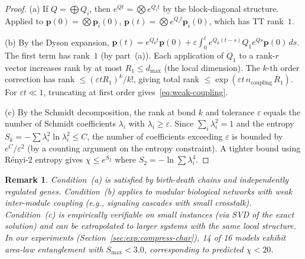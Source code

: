 \documentclass[11pt]{article}
\newtheorem{remark}[theorem]{Remark}
\newcommand{\eps}{\varepsilon}
\begin{document}
\begin{proof}
(a) If $Q = \bigoplus Q_i$, then $e^{Qt} = \bigotimes e^{Q_i t}$
by the block-diagonal structure.
Applied to $\mathbf{p}(0) = \bigotimes \mathbf{p}_i(0)$,
$\mathbf{p}(t) = \bigotimes e^{Q_i t}\mathbf{p}_i(0)$,
which has TT rank~$1$.

(b) By the Dyson expansion,
$\mathbf{p}(t) = e^{Q_0 t}\mathbf{p}(0) + \eps\int_0^t e^{Q_0(t-s)}Q_1 e^{Qs}\mathbf{p}(0)\,ds$.
The first term has rank~$1$ (by part~(a)).
Each application of $Q_1$ to a rank-$r$ vector increases rank by at most
$R_1 \leq d_{\max}$ (the local dimension).
The $k$-th order correction has rank $\leq (\eps t R_1)^k / k!$,
giving total rank $\leq \exp(\eps t\, n_{\mathrm{coupling}}\, R_1)$.
For $\eps t \ll 1$, truncating at first order gives~\eqref{eq:weak-coupling}.

(c) By the Schmidt decomposition, the rank at bond $k$ and tolerance $\eps$
equals the number of Schmidt coefficients $\lambda_i$ with $\lambda_i \geq \eps$.
Since $\sum_i \lambda_i^2 = 1$ and the entropy $S_k = -\sum \lambda_i^2 \ln \lambda_i^2 \leq C$,
the number of coefficients exceeding $\eps$ is bounded by $e^C / \eps^2$
(by a counting argument on the entropy constraint).
A tighter bound using R\'enyi-$2$ entropy gives $\chi \leq e^{S_2}$ where
$S_2 = -\ln \sum \lambda_i^4$.
\end{proof}

\begin{remark}
Condition~(a) is satisfied by birth-death chains and
independently regulated genes.
Condition~(b) applies to modular biological networks with
weak inter-module coupling (e.g., signaling cascades with
small crosstalk).
Condition~(c) is empirically verifiable on small instances
(via SVD of the exact solution) and can be extrapolated to
larger systems with the same local structure.
In our experiments (Section~\ref{sec:exp:compress-char}),
14 of 16 models exhibit area-law entanglement with
$S_{\max} < 3.0$, corresponding to predicted $\chi < 20$.
\end{remark}
\end{document}
